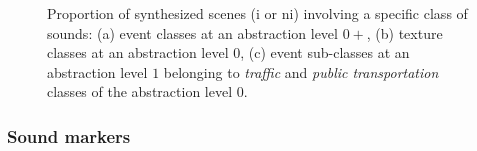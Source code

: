\documentclass[preprint,12pt]{elsarticle}
\newcommand{\myfloatalign}{\centering}
\begin{document}
\begin{figure}[t]
        \myfloatalign
         \par
       \caption{Proportion of synthesized scenes (i or ni) involving a specific class of sounds: (a) event classes at an abstraction level $0+$, (b) texture classes at an abstraction level $0$, (c) event sub-classes at an abstraction level $1$ belonging to \emph{traffic} and \emph{public transportation} classes of the abstraction level $0$.}\label{fig:soundsource}
\end{figure}

\subsubsection*{Sound markers}
\end{document}
